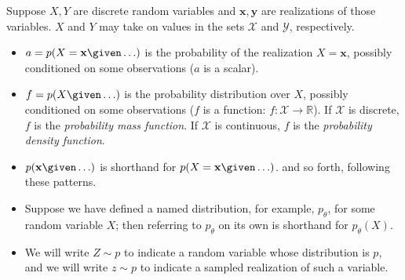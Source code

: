Suppose $X, Y$ are discrete random variables and $\mathbf{x}, \mathbf{y}$ are realizations of those variables. $X$ and $Y$ may take on values in the sets $\mathcal{X}$ and $\mathcal{Y}$, respectively.
\begin{itemize}
    \item $a = p(X = \mathbf{x} \given \ldots)$ is the probability of the realization $X = \mathbf{x}$, possibly conditioned on some observations ($a$ is a scalar).
    \item $f = p(X \given \ldots)$ is the probability distribution over $X$, possibly conditioned on some observations ($f$ is a function: $f: \mathcal{X} \rightarrow \mathbb{R}$). If $\mathcal{X}$ is discrete, $f$ is the \emph{probability mass function}. If $\mathcal{X}$ is continuous, $f$ is the \emph{probability density function}.
    \item $p(\mathbf{x} \given \ldots)$ is shorthand for $p(X = \mathbf{x} \given \ldots)$.
    and so forth, following these patterns.
    \item Suppose we have defined a named distribution, for example, $p_{\theta}$, for some random variable $X$; then referring to $p_{\theta}$ on its own is shorthand for $p_{\theta}(X)$.
    \item We will write $Z \sim p$ to indicate a random variable whose distribution is $p$, and we will write $z \sim p$ to indicate a sampled realization of such a variable.
\end{itemize}
